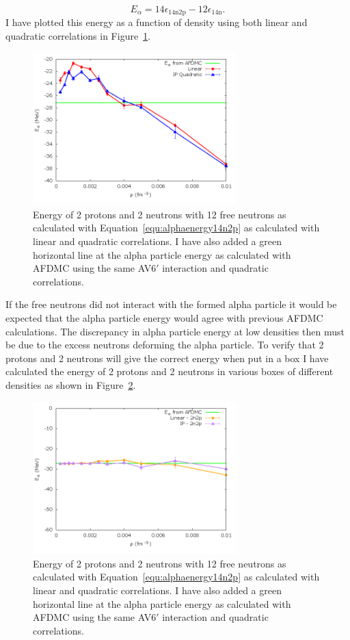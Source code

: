 \begin{equation}
   E_\alpha = 14\epsilon_\text{14n2p} - 12\epsilon_\text{14n}.
   \label{equ:alphaenergy14n2p}
\end{equation}
I have plotted this energy as a function of density using both linear and quadratic correlations in Figure~\ref{fig:alpha}.
\begin{figure}[h!]
   \centering
   \includegraphics[width=0.7\textwidth]{figures/alpha.png}
   \caption{Energy of 2 protons and 2 neutrons with 12 free neutrons as calculated with Equation~\ref{equ:alphaenergy14n2p} as calculated with linear and quadratic correlations. I have also added a green horizontal line at the alpha particle energy as calculated with AFDMC using the same AV6$'$ interaction and quadratic correlations.}
   \label{fig:alpha}
\end{figure}
If the free neutrons did not interact with the formed alpha particle it would be expected that the alpha particle energy would agree with previous AFDMC calculations. The discrepancy in alpha particle energy at low densities then must be due to the excess neutrons deforming the alpha particle. To verify that 2 protons and 2 neutrons will give the correct energy when put in a box I have calculated the energy of 2 protons and 2 neutrons in various boxes of different densities as shown in Figure~\ref{fig:alpha2n2p}.
\begin{figure}[h!]
   \centering
   \includegraphics[width=0.7\textwidth]{figures/2n2p.png}
   \caption{Energy of 2 protons and 2 neutrons with 12 free neutrons as calculated with Equation~\ref{equ:alphaenergy14n2p} as calculated with linear and quadratic correlations. I have also added a green horizontal line at the alpha particle energy as calculated with AFDMC using the same AV6$'$ interaction and quadratic correlations.}
   \label{fig:alpha2n2p}
\end{figure}
